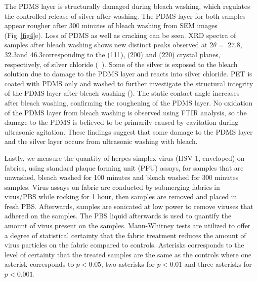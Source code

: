 \documentclass[10pt,letterpaper]{article}
\begin{document}
The PDMS layer is structurally damaged during bleach washing, which regulates the controlled release of silver after washing. The PDMS layer for both samples appear rougher after 300 minutes of bleach washing from SEM images (Fig~\ref{fig4}e). Loss of PDMS as well as cracking can be seen.  
XRD spectra of samples after bleach washing shows new distinct peaks observed at 2$\theta =$ 27.8\degree, 32.3\degree and 46.3\degree corresponding to the (111), (200) and (220) crystal planes, respectively, of silver chloride (~). 
Some of the silver is exposed to the bleach solution due to damage to the PDMS layer and reacts into silver chloride. %
PET is coated with PDMS only and washed to further investigate the structural integrity of the PDMS layer after bleach washing (). The static contact angle increases after bleach washing, confirming the roughening of the PDMS layer. No oxidation of the PDMS layer from bleach washing is observed using FTIR analysis, so the damage to the PDMS is believed to be primarily caused by cavitation during ultrasonic agitation. These findings suggest that some damage to the PDMS layer and the silver layer occurs from ultrasonic washing with bleach.   

Lastly, we measure the quantity of herpes simplex virus (HSV-1, enveloped) on fabrics, using standard plaque forming unit (PFU) assays, for samples that are unwashed, bleach washed for 100 minutes and bleach washed for 300 minutes samples.
Virus assays on fabric are conducted by submerging fabrics in virus/PBS while rocking for 1 hour, then samples are removed and placed in fresh PBS. Afterwards, samples are sonicated at low power to remove viruses that adhered on the samples. The PBS liquid afterwards is used to quantify the amount of virus present on the samples. Mann-Whitney tests are utilized to offer a degree of statistical certainty that the fabric treatment reduces the amount of virus particles on the fabric compared to controls. Asterisks corresponds to the level of certainty that the treated samples are the same as the controls where one asterisk corresponds to $p < 0.05$, two asterisks for $p < 0.01$ and three asterisks for $p < 0.001$.

\end{document}

